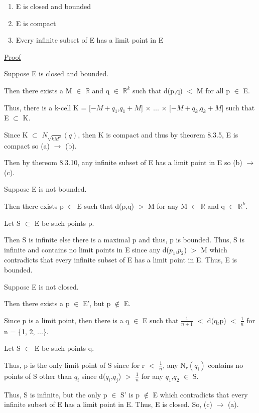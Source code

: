 	\begin{enumerate}[label=(\alph*), leftmargin=2cm, itemsep=0.1cm]
		\item E is closed and bounded
		\item E is compact
		\item Every infinite subset of E has a limit point in E
	\end{enumerate}

{ \color{magenta} \underline{Proof} } 

	Suppose E is closed and bounded.

	Then there exists a M $\in$ $\mathbb{R}$ and q $\in$ $\mathbb{R}^k$
	such that d(p,q) $<$ M for all p $\in$ E.
	
	Thus, there is a k-cell
	K = [$-M+q_1$,$q_1+M$] $\times$ ... $\times$ [$-M+q_k$,$q_k+M$]
	such that E $\subset$ K.

	Since K $\subset$ $N_{\sqrt{kM^2}}(q)$, then K is compact
	and thus by {\color{red} theorem 8.3.5}, E is compact
	so (a) $\rightarrow$ (b).

	Then by {\color{red} thereom 8.3.10}, any infinite subset
	of E has a limit point in E so (b) $\rightarrow$ (c).

	Suppose E is not bounded.

	Then there exists p $\in$ E such that d(p,q) $>$ M for
	any M $\in$ $\mathbb{R}$ and q $\in$ $\mathbb{R}^k$.

	Let S $\subset$ E be such points p.
	
	Then S is infinite else there is a maximal p and thus,
	p is bounded.
	Thus, S is infinite and contains no limit points in E
	since any d($p_1$,$p_2$) $>$ M which contradicts that
	every infinite subset of E has a limit point in E.
	Thus, E is bounded.

	Suppose E is not closed.

	Then there exists a p $\in$ E', but p $\not \in$ E.

	Since p is a limit point, then there is a
	q $\in$ E such that $\frac{1}{n+1}$ $<$ d(q,p) $<$ $\frac{1}{n}$
	for n = \{1, 2, ...\}.

	Let S $\subset$ E be such points q.

	Thus, p is the only limit point of S since for r $<$ $\frac{1}{n}$,
	any N$_r(q_i)$ contains no points of S other than $q_i$ since
	d($q_i$,$q_j$) $>$ $\frac{1}{n}$ for any $q_1$,$q_2$ $\in$ S.
	
	Thus, S is infinite, but the only p $\in$ S' is p $\not \in$ E
	which contradicts that every infinite subset of E has a
	limit point in E. Thus, E is closed. So, (c) $\rightarrow$ (a). \\

